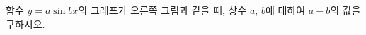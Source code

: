 \noindent\begin{minipage}[t]{0.58\linewidth}\vspace{0pt}\raggedright 함수 $y=a\sin bx$의 그래프가 오른쪽 그림과 같을 때, 상수 $a$, $b$에 대하여 $a-b$의 값을 구하시오. \end{minipage}\hfill\begin{minipage}[t]{0.4\linewidth}\vspace{0pt}\centering \resizebox{\ifdim\width>\linewidth\linewidth\else\width\fi}{!}{}\end{minipage}\par
